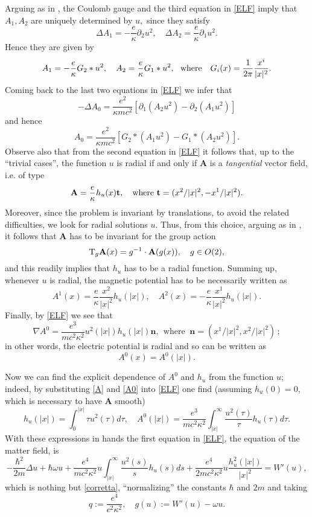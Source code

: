 \documentclass[11pt,leqno,twoside,reqno]{amsart}
\numberwithin{equation}{section}
\begin{document}
Arguing as in \cite{huh2}, the Coulomb gauge and the third equation in \eqref{ELF}
imply that $A_{1}, A_{2}$ are uniquely determined by $u,$
since they satisfy 
$$\Delta A_{1}=-\frac{e}{\kappa}\partial_{2} u^{2}, 
\quad
\Delta A_{2}=\frac{e}{\kappa}\partial_{1}u^{2}.$$
Hence they are given by
$$A_{1}=-\frac{e}{\kappa} G_{2}* u^{2}, 
\quad
A_{2}=\frac{e}{\kappa}G_{1}*u^{2},
\ \  \hbox{where } \ \
G_{i}(x)=\frac{1}{2\pi}\frac{x^{i}}{|x|^{2}}.$$
Coming back to the last two equations in \eqref{ELF} we infer that
$$-\Delta A_{0}= \frac{e^{2}}{\kappa m c^{2}} \left[\partial_{1}(A_{2}u^{2}) - \partial_{2}(A_{1}u^{2}) \right]$$
and hence
$$A_{0}=\frac{e^{2}}{\kappa m c^{2}}\left[ G_{2}* (A_{1}u^{2}) - G_{1}* (A_{2}u^{2}) \right].$$
Observe also that from the second equation in \eqref{ELF} it follows that, up to the ``trivial cases'',
the function $u$ is radial  if and only if $\mathbf A$ is a {\em tangential} vector field, i.e. of type
$$\mathbf A=\frac{e}{\kappa}h_{u}(x)\mathbf t,
\quad
\hbox{where }
\mathbf t=(x^{2}/|x|^{2},-x^{1}/|x|^{2}).$$ 
Moreover, since the problem is invariant by translations, to avoid the related difficulties, we look for radial solutions $u$. 
Thus, from this choice, arguing as in \cite[Lemma 3.3]{huh2}, it follows that
$\mathbf A$ has to be invariant for the group action
$${\rm T}_{g}\mathbf A(x)= g^{-1}\cdot \mathbf A (g(x)), 
\quad
g\in O(2),$$
and this readily implies that $h_{u}$ has to be a radial function.
Summing up, whenever $u$ is radial, the magnetic potential has to be necessarily written as
\begin{equation}\label{A}
A^{1}(x)=\frac{e}{\kappa}\frac{x^{2}}{|x|^{2}}h_{u}(|x|),
\quad
A^{2}(x)=-\frac{e}{\kappa}\frac{x^{1}}{|x|^{2}}  h_{u}(|x|).
\end{equation}
Finally, by \eqref{ELF} we see that 
$$\nabla A^{0}=\frac{e^{3}}{mc^{2}\kappa^{2} } u^{2}(|x|)h_{u}(|x|)  \mathbf n,
\ \ \text{where } \ \mathbf n=(x^{1}/|x|^{2}, x^{2}/|x|^{2})\,;
$$
in other words, the electric potential is radial and so can be written as
\begin{equation}\label{A0}
A^{0}(x)=A^{0}(|x|).
\end{equation}

Now we can find the explicit dependence of $A^{0}$ and $h_{u}$ from the function $u$;
indeed, by substituting \eqref{A} and \eqref{A0} into \eqref{ELF} 
one find (assuming $h_{u}(0)=0$, which is necessary to have $\mathbf A$ smooth)
\[
h_{u}(|x|)=
\int_{0}^{|x|}\tau u^{2}(\tau)d\tau,
\quad
A^{0}(|x|)=\frac{e^{3}}{ m c^2\kappa^{2}} \int_{|x|}^{\infty}\frac{u^{2}(\tau)}{\tau} h_{u}(\tau) d\tau.
\] 
With these expressions in hands the first equation in \eqref{ELF}, the  equation of the matter field, 
is
\begin{equation*} 
-\frac{\hbar^{2}}{2m}\Delta u+\hbar\omega u+
\frac{e^{4}}{mc^{2}\kappa^{2}}u\int_{|x|}^{\infty}\frac{u^{2}(s)}{s}h_{u}(s)ds+
\frac{e^{4}}{2mc^{2}\kappa^{2}}u\frac{h_{u}^{2}(|x|)}{|x|^{2}} = W'(u),
\end{equation*}
which is nothing but  \eqref{corretta}, ``normalizing'' the constants $\hbar$  and $2m$  and taking 
$$ q:=\frac{e^4}{c^2 \kappa^2}, \quad 
  g(u):=W'(u)-\omega u.
$$
\end{document}
